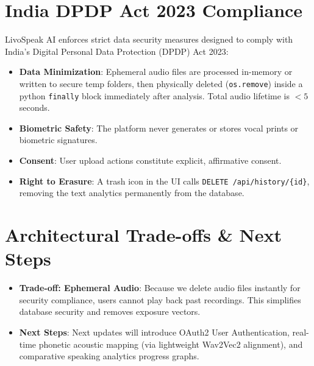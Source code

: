 \documentclass[11pt,a4paper]{article}
\begin{document}
\section{India DPDP Act 2023 Compliance}
LivoSpeak AI enforces strict data security measures designed to comply with India's Digital Personal Data Protection (DPDP) Act 2023:

\begin{tcolorbox}[colback=red!5!white,colframe=red!75!black,title=DPDP Compliance Summary]
\begin{itemize}
    \item \textbf{Data Minimization}: Ephemeral audio files are processed in-memory or written to secure temp folders, then physically deleted (\texttt{os.remove}) inside a python \texttt{finally} block immediately after analysis. Total audio lifetime is $< 5$ seconds.
    \item \textbf{Biometric Safety}: The platform never generates or stores vocal prints or biometric signatures.
    \item \textbf{Consent}: User upload actions constitute explicit, affirmative consent.
    \item \textbf{Right to Erasure}: A trash icon in the UI calls \texttt{DELETE /api/history/\{id\}}, removing the text analytics permanently from the database.
\end{itemize}
\end{tcolorbox}

\section{Architectural Trade-offs \& Next Steps}
\begin{itemize}
    \item \textbf{Trade-off: Ephemeral Audio}: Because we delete audio files instantly for security compliance, users cannot play back past recordings. This simplifies database security and removes exposure vectors.
    \item \textbf{Next Steps}: Next updates will introduce OAuth2 User Authentication, real-time phonetic acoustic mapping (via lightweight Wav2Vec2 alignment), and comparative speaking analytics progress graphs.
\end{itemize}
\end{document}
